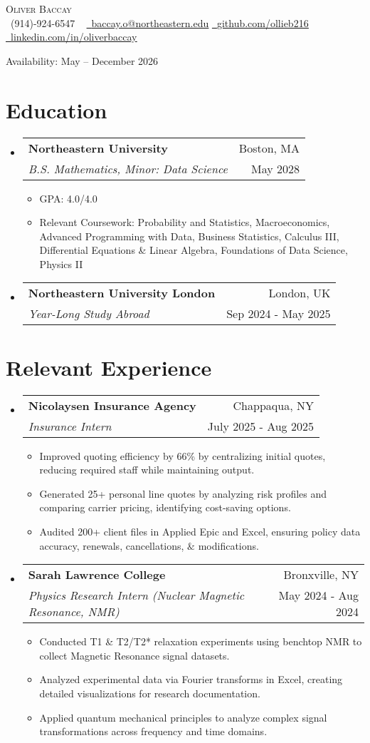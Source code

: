 \documentclass[letterpaper,11pt]{article}
\makeatletter
\newcommand{\resumeItem}[1]{\item\small{#1}}
\newcommand{\resumeSubheading}[4]{
  \item
  \begin{tabular*}{1.0\textwidth}[t]{l@{\extracolsep{\fill}}r}
    \textbf{#1} & #2 \\
    \textit{\small#3} & #4 \\
  \end{tabular*}
}
\newcommand{\resumeSubHeadingListStart}{\begin{itemize}[leftmargin=0in, label={}]}
\newcommand{\resumeSubHeadingListEnd}{\end{itemize}}
\newcommand{\resumeItemListStart}{\begin{itemize}[leftmargin=0.2in, label=$\bullet$]}
\newcommand{\resumeItemListEnd}{\end{itemize}}
\makeatother
\begin{document}
\begin{center}
    {\Huge \scshape Oliver Baccay} \\ \vspace{1pt}
    \small 
    \raisebox{-0.1\height}\faPhone\ (914)-924-6547 ~ 
    \href{mailto:baccay.o@northeastern.edu}{\raisebox{-0.2\height}\faEnvelope\  \underline{baccay.o@northeastern.edu}} 
    \href{https://github.com/ollieb216}{\raisebox{-0.2\height}\faGithub\ \underline{github.com/ollieb216}} ~
    \href{https://linkedin.com/in/oliverbaccay}{\raisebox{-0.2\height}\faLinkedin\ \underline{linkedin.com/in/oliverbaccay}} 
    
    {Availability: May – December 2026}
\end{center}

\section{Education}
\resumeSubHeadingListStart
    \resumeSubheading{Northeastern University}{Boston, MA}{B.S. Mathematics, Minor: Data Science}{May 2028}
    \resumeItemListStart
        \resumeItem{GPA: 4.0/4.0}
        \resumeItem{Relevant Coursework: Probability and Statistics, Macroeconomics, Advanced Programming with Data, Business Statistics, Calculus III, Differential Equations \& Linear Algebra, Foundations of Data Science, Physics II}
    \resumeItemListEnd
    
    \resumeSubheading{Northeastern University London}{London, UK}{Year-Long Study Abroad}{Sep 2024 - May 2025}
\resumeSubHeadingListEnd

\section{Relevant Experience}
\resumeSubHeadingListStart
    \resumeSubheading{Nicolaysen Insurance Agency}{Chappaqua, NY}{Insurance Intern}{July 2025 - Aug 2025}
    \resumeItemListStart
        \resumeItem{Improved quoting efficiency by 66\% by centralizing initial quotes, reducing required staff while maintaining output.}
        \resumeItem{Generated 25+ personal line quotes by analyzing risk profiles and comparing carrier pricing, identifying cost-saving options.}
        \resumeItem{Audited 200+ client files in Applied Epic and Excel, ensuring policy data accuracy, renewals, cancellations, $\&$ modifications.}
    \resumeItemListEnd

    \resumeSubheading{Sarah Lawrence College}{Bronxville, NY}{Physics Research Intern (Nuclear Magnetic Resonance, NMR)}{May 2024 - Aug 2024}
    \resumeItemListStart
        \resumeItem{Conducted T1 \& T2/T2* relaxation experiments using benchtop NMR to collect Magnetic Resonance signal datasets.}
        \resumeItem{Analyzed experimental data via Fourier transforms in Excel, creating detailed visualizations for research documentation.}
        \resumeItem{Applied quantum mechanical principles to analyze complex signal transformations across frequency and time domains.}
    \resumeItemListEnd
\resumeSubHeadingListEnd
\end{document}
